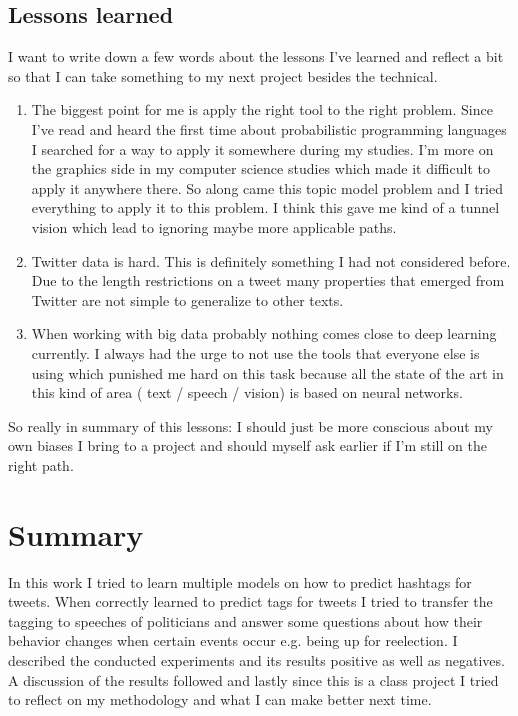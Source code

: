 \documentclass[10pt,conference,compsocconf]{IEEEtran}
\begin{document}
\subsection{Lessons learned}
I want to write down a few words about the lessons I've learned and reflect a bit so that I can take something to my next project besides the technical. 
\begin{enumerate}
	\item The biggest point for me is apply the right tool to the right problem. Since I've read and heard the first time about probabilistic programming languages I searched for a way to apply it somewhere during my studies. I'm more on the graphics side in my computer science studies which made it difficult to apply it anywhere there. So along came this topic model problem and I tried everything to apply it to this problem. I think this gave me kind of a tunnel vision which lead to ignoring maybe more applicable paths.
	\item Twitter data is hard. This is definitely something I had not considered before. Due to the length restrictions on a tweet many properties that emerged from Twitter are not simple to generalize to other texts. 
	\item When working with big data probably nothing comes close to deep learning currently. I always had the urge to not use the tools that everyone else is using which punished me hard on this task because all the state of the art in this kind of area ( text / speech / vision) is based on neural networks. 
\end{enumerate}
So really in summary of this lessons: I should just be more conscious about my own biases I bring to a project and should myself ask earlier if I'm still on the right path. 


\section{Summary}
\label{sec:Summary}
In this work I tried to learn multiple models on how to predict hashtags for tweets. When correctly learned to predict tags for tweets I tried to transfer the tagging to speeches of politicians and answer some questions about how their behavior changes when certain events occur e.g. being up for reelection. I described the conducted experiments and its results positive as well as negatives. A discussion of the results followed and lastly since this is a class project I tried to reflect on my methodology and what I can make better next time. 
\end{document}
